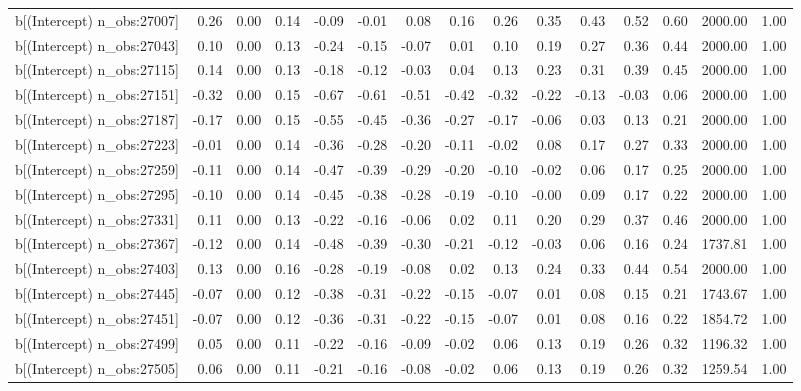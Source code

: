 \begin{table}[ht]
\begin{tabular}{rrrrrrrrrrrrrrr}
  b[(Intercept) n\_obs:27007] & 0.26 & 0.00 & 0.14 & -0.09 & -0.01 & 0.08 & 0.16 & 0.26 & 0.35 & 0.43 & 0.52 & 0.60 & 2000.00 & 1.00 \\ 
  b[(Intercept) n\_obs:27043] & 0.10 & 0.00 & 0.13 & -0.24 & -0.15 & -0.07 & 0.01 & 0.10 & 0.19 & 0.27 & 0.36 & 0.44 & 2000.00 & 1.00 \\ 
  b[(Intercept) n\_obs:27115] & 0.14 & 0.00 & 0.13 & -0.18 & -0.12 & -0.03 & 0.04 & 0.13 & 0.23 & 0.31 & 0.39 & 0.45 & 2000.00 & 1.00 \\ 
  b[(Intercept) n\_obs:27151] & -0.32 & 0.00 & 0.15 & -0.67 & -0.61 & -0.51 & -0.42 & -0.32 & -0.22 & -0.13 & -0.03 & 0.06 & 2000.00 & 1.00 \\ 
  b[(Intercept) n\_obs:27187] & -0.17 & 0.00 & 0.15 & -0.55 & -0.45 & -0.36 & -0.27 & -0.17 & -0.06 & 0.03 & 0.13 & 0.21 & 2000.00 & 1.00 \\ 
  b[(Intercept) n\_obs:27223] & -0.01 & 0.00 & 0.14 & -0.36 & -0.28 & -0.20 & -0.11 & -0.02 & 0.08 & 0.17 & 0.27 & 0.33 & 2000.00 & 1.00 \\ 
  b[(Intercept) n\_obs:27259] & -0.11 & 0.00 & 0.14 & -0.47 & -0.39 & -0.29 & -0.20 & -0.10 & -0.02 & 0.06 & 0.17 & 0.25 & 2000.00 & 1.00 \\ 
  b[(Intercept) n\_obs:27295] & -0.10 & 0.00 & 0.14 & -0.45 & -0.38 & -0.28 & -0.19 & -0.10 & -0.00 & 0.09 & 0.17 & 0.22 & 2000.00 & 1.00 \\ 
  b[(Intercept) n\_obs:27331] & 0.11 & 0.00 & 0.13 & -0.22 & -0.16 & -0.06 & 0.02 & 0.11 & 0.20 & 0.29 & 0.37 & 0.46 & 2000.00 & 1.00 \\ 
  b[(Intercept) n\_obs:27367] & -0.12 & 0.00 & 0.14 & -0.48 & -0.39 & -0.30 & -0.21 & -0.12 & -0.03 & 0.06 & 0.16 & 0.24 & 1737.81 & 1.00 \\ 
  b[(Intercept) n\_obs:27403] & 0.13 & 0.00 & 0.16 & -0.28 & -0.19 & -0.08 & 0.02 & 0.13 & 0.24 & 0.33 & 0.44 & 0.54 & 2000.00 & 1.00 \\ 
  b[(Intercept) n\_obs:27445] & -0.07 & 0.00 & 0.12 & -0.38 & -0.31 & -0.22 & -0.15 & -0.07 & 0.01 & 0.08 & 0.15 & 0.21 & 1743.67 & 1.00 \\ 
  b[(Intercept) n\_obs:27451] & -0.07 & 0.00 & 0.12 & -0.36 & -0.31 & -0.22 & -0.15 & -0.07 & 0.01 & 0.08 & 0.16 & 0.22 & 1854.72 & 1.00 \\ 
  b[(Intercept) n\_obs:27499] & 0.05 & 0.00 & 0.11 & -0.22 & -0.16 & -0.09 & -0.02 & 0.06 & 0.13 & 0.19 & 0.26 & 0.32 & 1196.32 & 1.00 \\ 
  b[(Intercept) n\_obs:27505] & 0.06 & 0.00 & 0.11 & -0.21 & -0.16 & -0.08 & -0.02 & 0.06 & 0.13 & 0.19 & 0.26 & 0.32 & 1259.54 & 1.00 \\ 

\end{tabular}
\end{table}
